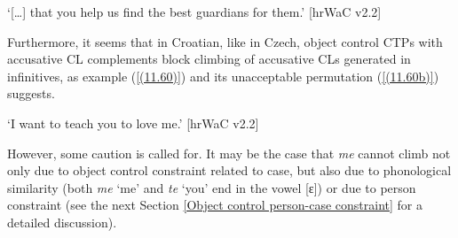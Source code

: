 \begin{exe}\ex
\begin{xlist}
\end{xlist}
\glt ‘[\dots] that you help us find the best guardians for them.’
\hfill [hrWaC v2.2]
\end{exe}

\noindent Furthermore, it seems that in Croatian, like in Czech, object control CTPs with accusative CL complements block climbing of accusative CLs generated in infinitives, as example (\ref{(11.60)}) and its unacceptable permutation (\ref{(11.60b)}) suggests.

\begin{exe}\ex
\begin{xlist}
\end{xlist} 
\glt ‘I want to teach you to love me.’
\hfill [hrWaC v2.2]
\end{exe}

\noindent However, some caution is called for. It may be the case that \textit{me} cannot climb not only due to object control constraint related to case, but also due to phonological similarity (both \textit{me} ‘me’ and \textit{te} ‘you’ end in the vowel [ɛ]) or due to person constraint (see the next Section \ref{Object control person-case constraint} for a detailed discussion).

